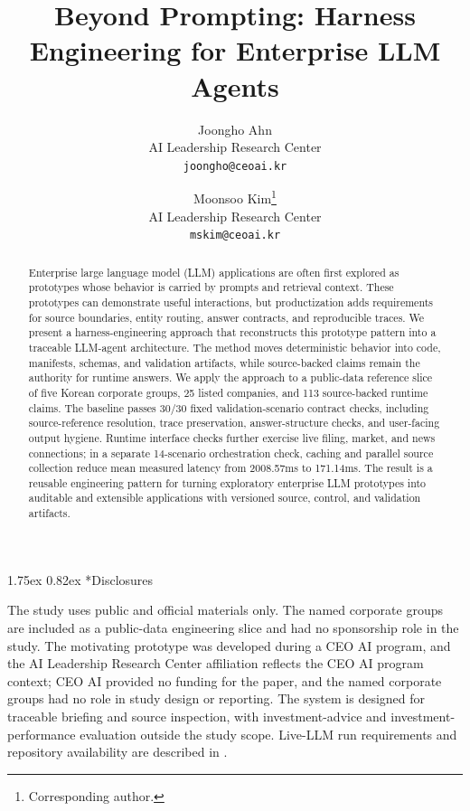 \documentclass[11pt]{article}
\title{Beyond Prompting: Harness Engineering for Enterprise LLM Agents}
\author{%
  Joongho Ahn\\
  AI Leadership Research Center\\
  \texttt{joongho@ceoai.kr}
  \and
  Moonsoo Kim\thanks{Corresponding author.}\\
  AI Leadership Research Center\\
  \texttt{mskim@ceoai.kr}
}
\date{}
\makeatletter
\renewcommand\section{\@startsection{section}{1}{\z@}%
  {1.75ex}%
  {0.82ex}%
  {\normalfont\Large\bfseries}}
\makeatother
\begin{document}
\maketitle

\begin{abstract}
Enterprise large language model (LLM) applications are often first explored as prototypes whose behavior is carried by prompts and retrieval context. These prototypes can demonstrate useful interactions, but productization adds requirements for source boundaries, entity routing, answer contracts, and reproducible traces. We present a harness-engineering approach that reconstructs this prototype pattern into a traceable LLM-agent architecture. The method moves deterministic behavior into code, manifests, schemas, and validation artifacts, while source-backed claims remain the authority for runtime answers. We apply the approach to a public-data reference slice of five Korean corporate groups, 25 listed companies, and 113 source-backed runtime claims. The baseline passes 30/30 fixed validation-scenario contract checks, including source-reference resolution, trace preservation, answer-structure checks, and user-facing output hygiene. Runtime interface checks further exercise live filing, market, and news connections; in a separate 14-scenario orchestration check, caching and parallel source collection reduce mean measured latency from 2008.57ms to 171.14ms. The result is a reusable engineering pattern for turning exploratory enterprise LLM prototypes into auditable and extensible applications with versioned source, control, and validation artifacts.
\end{abstract}










\section*{Disclosures}

The study uses public and official materials only. The named corporate groups are included as a public-data engineering slice and had no sponsorship role in the study. The motivating prototype was developed during a CEO AI program, and the AI Leadership Research Center affiliation reflects the CEO AI program context; CEO AI provided no funding for the paper, and the named corporate groups had no role in study design or reporting. The system is designed for traceable briefing and source inspection, with investment-advice and investment-performance evaluation outside the study scope. Live-LLM run requirements and repository availability are described in .
\end{document}
